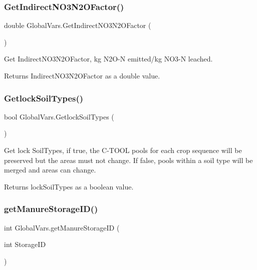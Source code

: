\subsubsection{\texorpdfstring{GetIndirectNO3N2OFactor()}{GetIndirectNO3N2OFactor()}}
{\footnotesize\ttfamily double Global\+Vars.\+Get\+Indirect\+N\+O3\+N2\+O\+Factor (\begin{DoxyParamCaption}{ }\end{DoxyParamCaption})\hspace{0.3cm}{\ttfamily [inline]}}



Get Indirect\+N\+O3\+N2\+O\+Factor, kg N2\+O-\/N emitted/kg N\+O3-\/N leached. 

\begin{DoxyReturn}{Returns}
Indirect\+N\+O3\+N2\+O\+Factor as a double value. 
\end{DoxyReturn}
\mbox{\label{class_global_vars_aecb1271311c367bb97c21aa337a05447}} 
\subsubsection{\texorpdfstring{GetlockSoilTypes()}{GetlockSoilTypes()}}
{\footnotesize\ttfamily bool Global\+Vars.\+Getlock\+Soil\+Types (\begin{DoxyParamCaption}{ }\end{DoxyParamCaption})\hspace{0.3cm}{\ttfamily [inline]}}



Get lock Soil\+Types, if true, the C-\/\+T\+O\+OL pools for each crop sequence will be preserved but the areas must not change. If false, pools within a soil type will be merged and areas can change. 

\begin{DoxyReturn}{Returns}
lock\+Soil\+Types as a boolean value. 
\end{DoxyReturn}
\mbox{\label{class_global_vars_ae2f4d6e549b93b918adc8ec6d8f29bf4}} 
\subsubsection{\texorpdfstring{getManureStorageID()}{getManureStorageID()}}
{\footnotesize\ttfamily int Global\+Vars.\+get\+Manure\+Storage\+ID (\begin{DoxyParamCaption}\item[{int}]{Storage\+ID }\end{DoxyParamCaption})\hspace{0.3cm}{\ttfamily [inline]}}




